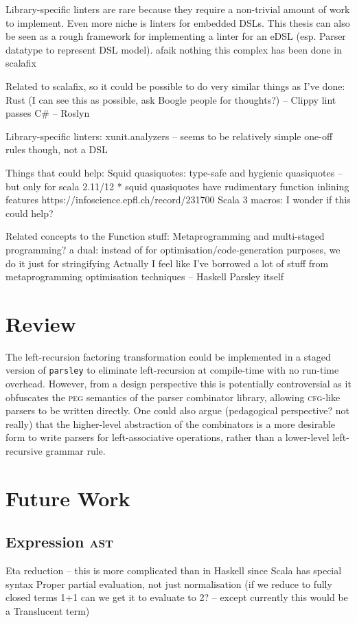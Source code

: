 \documentclass[../../main.tex]{subfiles}
\begin{document}
Library-specific linters are rare because they require a non-trivial amount of work to implement.
Even more niche is linters for embedded DSLs.
This thesis can also be seen as a rough framework for implementing a linter for an eDSL (esp. Parser datatype to represent DSL model).
afaik nothing this complex has been done in scalafix

Related to scalafix, so it could be possible to do very similar things as I've done:
Rust (I can see this as possible, ask Boogle people for thoughts?) -- Clippy lint passes %
C\# -- Roslyn

Library-specific linters:
xunit.analyzers -- seems to be relatively simple one-off rules though, not a DSL

Things that could help:
Squid quasiquotes: type-safe and hygienic quasiquotes -- but only for scala 2.11/12
* squid quasiquotes have rudimentary function inlining features https://infoscience.epfl.ch/record/231700
Scala 3 macros: I wonder if this could help?

Related concepts to the Function stuff:
Metaprogramming and multi-staged programming? a dual: instead of for optimisation/code-generation purposes, we do it just for stringifying
Actually I feel like I've borrowed a lot of stuff from metaprogramming optimisation techniques -- Haskell Parsley itself

\section{Review}
The left-recursion factoring transformation could be implemented in a staged version of \texttt{parsley} to eliminate left-recursion at compile-time with no run-time overhead.
However, from a design perspective this is potentially controversial as it obfuscates the \textsc{peg} semantics of the parser combinator library, allowing \textsc{cfg}-like parsers to be written directly.
One could also argue (pedagogical perspective? not really) that the higher-level abstraction of the  combinators is a more desirable form to write parsers for left-associative operations, rather than a lower-level left-recursive grammar rule.

\section{Future Work}
\subsection{Expression \textsc{ast}}
Eta reduction -- this is more complicated than in Haskell since Scala has special syntax %
Proper partial evaluation, not just normalisation (if we reduce to fully closed terms 1+1 can we get it to evaluate to 2? -- except currently this would be a Translucent term)
\end{document}
